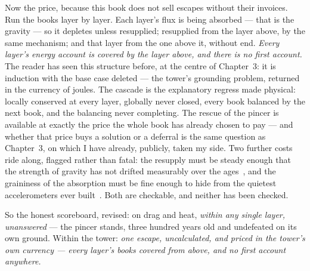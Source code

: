 \documentclass[fontsize=11pt,paper=a4,pagesize=auto,parskip=half-]{scrbook}
\begin{document}
Now the price, because this book does not sell escapes without their invoices. Run the books layer by layer. Each layer's flux is being absorbed --- that is the gravity --- so it depletes unless resupplied; resupplied from the layer above, by the same mechanism; and that layer from the one above it, without end. \emph{Every layer's energy account is covered by the layer above, and there is no first account.} The reader has seen this structure before, at the centre of Chapter~3: it is induction with the base case deleted --- the tower's grounding problem, returned in the currency of joules. The cascade is the explanatory regress made physical: locally conserved at every layer, globally never closed, every book balanced by the next book, and the balancing never completing. The rescue of the pincer is available at exactly the price the whole book has already chosen to pay --- and whether that price buys a solution or a deferral is the same question as Chapter~3, on which I have already, publicly, taken my side. Two further costs ride along, flagged rather than fatal: the resupply must be steady enough that the strength of gravity has not drifted measurably over the ages~\cite{hofmann2018}, and the graininess of the absorption must be fine enough to hide from the quietest accelerometers ever built~\cite{armano2018}. Both are checkable, and neither has been checked.

So the honest scoreboard, revised: on drag and heat, \emph{within any single layer, unanswered} --- the pincer stands, three hundred years old and undefeated on its own ground. Within the tower: \emph{one escape, uncalculated, and priced in the tower's own currency --- every layer's books covered from above, and no first account anywhere.}
\end{document}
